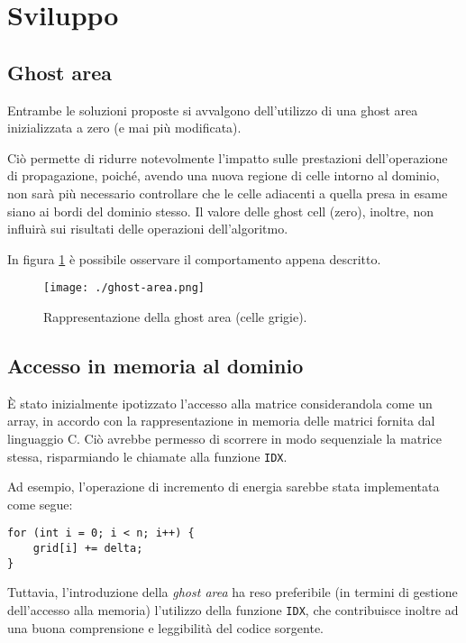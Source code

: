 \section{Sviluppo}

\subsection{Ghost area}

Entrambe le soluzioni proposte si avvalgono dell'utilizzo di una ghost area
inizializzata a zero (e mai più modificata).

Ciò permette di ridurre notevolmente l'impatto sulle prestazioni
dell'operazione di propagazione, poiché, avendo una nuova regione di celle
intorno al dominio, non sarà più necessario controllare che le celle adiacenti a
quella presa in esame siano ai bordi del dominio stesso.
Il valore delle ghost cell (zero), inoltre, non influirà sui risultati delle
operazioni dell'algoritmo.

In figura \ref{fig:ghostarea} \cite{marzollaghost} è possibile osservare il
comportamento appena descritto.

\begin{figure}[!ht]
  \centering
  \texttt{[image: ./ghost-area.png]}
  \caption{Rappresentazione della ghost area (celle
  grigie).}\label{fig:ghostarea}
\end{figure}

\subsection{Accesso in memoria al dominio}

È stato inizialmente ipotizzato l'accesso alla matrice considerandola come un
array, in accordo con la rappresentazione in memoria delle matrici fornita dal
linguaggio C.
Ciò avrebbe permesso di scorrere in modo sequenziale la matrice stessa,
risparmiando le chiamate alla funzione \texttt{IDX}.

Ad esempio, l'operazione di incremento di energia sarebbe stata implementata
come segue:
\begin{verbatim}
for (int i = 0; i < n; i++) {
    grid[i] += delta;
}
\end{verbatim}

Tuttavia, l'introduzione della \textit{ghost area} ha reso preferibile (in
termini di gestione dell'accesso alla memoria) l'utilizzo della funzione
\texttt{IDX}, che contribuisce inoltre ad una buona comprensione e leggibilità
del codice sorgente.

